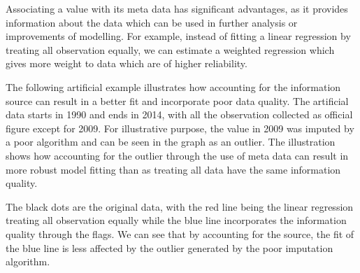 \documentclass[nojss]{jss}\usepackage[]{graphicx}\usepackage[]{color}
\begin{document}
Associating a value with its meta data has significant advantages, as
it provides information about the data which can be used in further
analysis or improvements of modelling. For example, instead of fitting
a linear regression by treating all observation equally, we can
estimate a weighted regression which gives more weight to data which
are of higher reliability. 


The following artificial example illustrates how accounting for the
information source can result in a better fit and incorporate poor
data quality. The artificial data starts in 1990 and ends in 2014,
with all the observation collected as official figure except for
2009. For illustrative purpose, the value in 2009 was imputed by a
poor algorithm and can be seen in the graph as an outlier. The
illustration shows how accounting for the outlier through the use of
meta data can result in more robust model fitting than as treating all
data have the same information quality.

The black dots are the original data, with the red line being the
linear regression treating all observation equally while the blue line
incorporates the information quality through the flags. We can see
that by accounting for the source, the fit of the blue line is less
affected by the outlier generated by the poor imputation algorithm.
\end{document}
